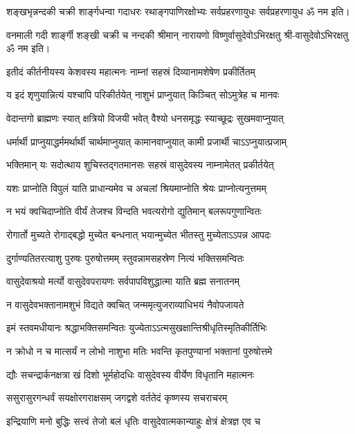 \twolineshloka
{शङ्खभृन्नन्दकी चक्री शार्ङ्गधन्वा गदाधरः}
{रथाङ्गपाणिरक्षोभ्यः सर्वप्रहरणायुधः}
सर्वप्रहरणायुध ॐ नम इति।

\twolineshloka
{वनमाली गदी शार्ङ्गी शङ्खी चक्री च नन्दकी}
{श्रीमान् नारायणो विष्णुर्वासुदेवोऽभिरक्षतु}%
श्री-वासुदेवोऽभिरक्षतु ॐ नम इति।

\resetShloka
\twolineshloka
{इतीदं कीर्तनीयस्य केशवस्य महात्मनः}
{नाम्नां सहस्रं दिव्यानामशेषेण प्रकीर्तितम्}

\twolineshloka
{य इदं शृणुयान्नित्यं यश्चापि परिकीर्तयेत्}
{नाशुभं प्राप्नुयात् किञ्चित् सोऽमुत्रेह च मानवः}

\twolineshloka
{वेदान्तगो ब्राह्मणः स्यात् क्षत्रियो विजयी भवेत्}
{वैश्यो धनसमृद्धः स्याच्छूद्रः सुखमवाप्नुयात्}

\twolineshloka
{धर्मार्थी प्राप्नुयाद्धर्ममर्थार्थी चार्थमाप्नुयात्}
{कामानवाप्नुयात् कामी प्रजार्थी चाऽऽप्नुयात्प्रजाम्}

\twolineshloka
{भक्तिमान् यः सदोत्थाय शुचिस्तद्गतमानसः}
{सहस्रं वासुदेवस्य नाम्नामेतत् प्रकीर्तयेत्}

\twolineshloka
{यशः प्राप्नोति विपुलं याति प्राधान्यमेव च}
{अचलां श्रियमाप्नोति श्रेयः प्राप्नोत्यनुत्तमम्}

\twolineshloka
{न भयं क्वचिदाप्नोति वीर्यं तेजश्च विन्दति}
{भवत्यरोगो द्युतिमान् बलरूपगुणान्वितः}

\twolineshloka
{रोगार्तो मुच्यते रोगाद्बद्धो मुच्येत बन्धनात्}
{भयान्मुच्येत भीतस्तु मुच्येताऽऽपन्न आपदः}

\twolineshloka
{दुर्गाण्यतितरत्याशु पुरुषः पुरुषोत्तमम्}
{स्तुवन्नामसहस्रेण नित्यं भक्तिसमन्वितः}

\twolineshloka
{वासुदेवाश्रयो मर्त्यो वासुदेवपरायणः}
{सर्वपापविशुद्धात्मा याति ब्रह्म सनातनम्}

\twolineshloka
{न वासुदेवभक्तानामशुभं विद्यते क्वचित्}
{जन्ममृत्युजराव्याधिभयं नैवोपजायते}

\twolineshloka
{इमं स्तवमधीयानः श्रद्धाभक्तिसमन्वितः}
{युज्येताऽऽत्मसुखक्षान्तिश्रीधृतिस्मृतिकीर्तिभिः}

\twolineshloka
{न क्रोधो न च मात्सर्यं न लोभो नाशुभा मतिः}
{भवन्ति कृतपुण्यानां भक्तानां पुरुषोत्तमे}

\twolineshloka
{द्यौः सचन्द्रार्कनक्षत्रा खं दिशो भूर्महोदधिः}
{वासुदेवस्य वीर्येण विधृतानि महात्मनः}

\twolineshloka
{ससुरासुरगन्धर्वं सयक्षोरगराक्षसम्}
{जगद्वशे वर्ततेदं कृष्णस्य सचराचरम्}

\twolineshloka
{इन्द्रियाणि मनो बुद्धिः सत्त्वं तेजो बलं धृतिः}
{वासुदेवात्मकान्याहुः क्षेत्रं क्षेत्रज्ञ एव च}

